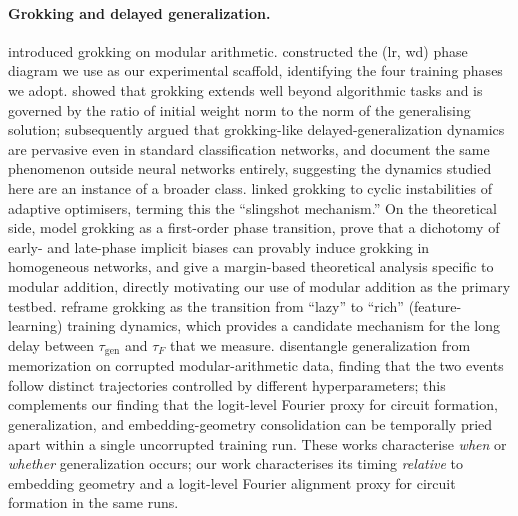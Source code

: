 \documentclass{article}
\newcommand{\taug}{\tau_{\mathrm{gen}}}
\newcommand{\tauf}{\tau_{F}}
\begin{document}
\paragraph{Grokking and delayed generalization.}
\citet{power2022grokking} introduced grokking on modular arithmetic.
\citet{liu2022towards} constructed the (lr, wd) phase diagram we
use as our experimental scaffold, identifying the four training
phases we adopt.
\citet{liu2023omnigrok} showed that grokking extends well beyond
algorithmic tasks and is governed by the ratio of initial weight
norm to the norm of the generalising solution;
\citet{humayun2024deep} subsequently argued that grokking-like
delayed-generalization dynamics are pervasive even in standard
classification networks, and \citet{miller2024grokking} document
the same phenomenon outside neural networks entirely, suggesting
the dynamics studied here are an instance of a broader class.
\citet{thilak2022slingshot} linked grokking to cyclic instabilities
of adaptive optimisers, terming this the ``slingshot mechanism.''
On the theoretical side, \citet{rubin2024grokking} model grokking
as a first-order phase transition, \citet{lyu2024dichotomy}
prove that a dichotomy of early- and late-phase implicit biases
can provably induce grokking in homogeneous networks, and
\citet{mohamadi2024grok} give a margin-based theoretical analysis
specific to modular addition, directly motivating our use of
modular addition as the primary testbed.
\citet{kumar2024lazy} reframe grokking as the transition from
``lazy'' to ``rich'' (feature-learning) training dynamics, which
provides a candidate mechanism for the long delay between
$\taug$ and $\tauf$ that we measure.
\citet{doshi2024grok} disentangle generalization from memorization
on corrupted modular-arithmetic data, finding that the two events
follow distinct trajectories controlled by different hyperparameters;
this complements our finding that the logit-level Fourier proxy
for circuit formation, generalization, and embedding-geometry
consolidation can be temporally pried apart within a single
uncorrupted training run.
These works characterise \emph{when} or \emph{whether} generalization
occurs; our work characterises its timing \emph{relative} to
embedding geometry and a logit-level Fourier alignment proxy for
circuit formation in the same runs.
\end{document}
